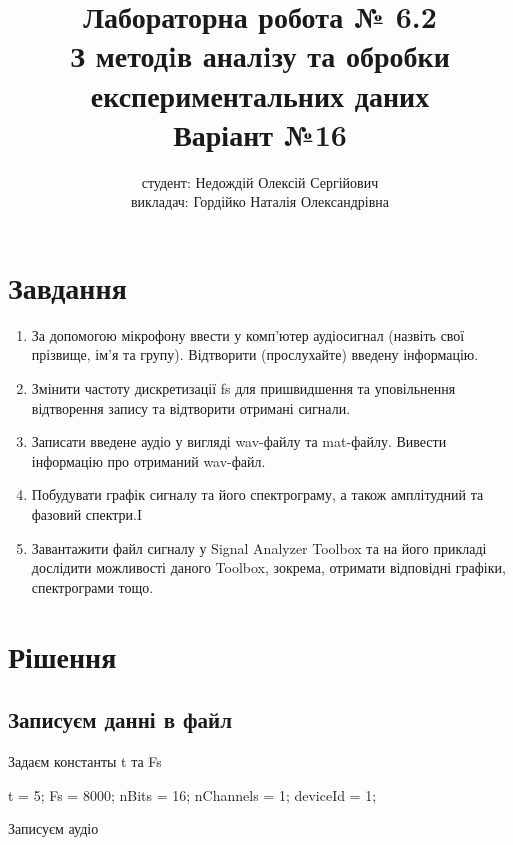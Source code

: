 \documentclass[12pt]{article}
\author{студент: Недождій Олексій Сергійович \\
         викладач: Гордійко Наталія Олександрівна}
\title{Лабораторна робота № 6.2\\
    З методiв аналiзу та обробки\\
    експериментальних даних\\
       Варіант №16}
\date{}
\begin{document}
\maketitle

\section{Завдання}
\begin{enumerate}
    \item
        За допомогою мікрофону ввести у комп'ютер аудіосигнал (назвіть свої
        прізвище, ім’я та групу). Відтворити (прослухайте) введену інформацію.
    \item
        Змінити частоту дискретизації fs для пришвидшення та уповільнення
        відтворення запису та відтворити отримані сигнали.
    \item
        Записати введене аудіо у вигляді wav-файлу та mat-файлу. Вивести
        інформацію про отриманий wav-файл.
    \item
        Побудувати графік сигналу та його спектрограму, а також
        амплітудний та фазовий спектри.I
    \item
        Завантажити файл сигналу у Signal Analyzer Toolbox та на його
        прикладі дослідити можливості даного Toolbox, зокрема, отримати відповідні
        графіки, спектрограми тощо.
\end{enumerate}

\newpage
\section{Рішення}
\subsection*{Записуєм данні в файл}
\begin{par}
\begin{flushleft}
Задаєм константы t та Fs
\end{flushleft}
\end{par}

\begin{matlabcode}
t = 5;
Fs = 8000;
nBits = 16;
nChannels = 1;
deviceId = 1;
\end{matlabcode}

\begin{par}
\begin{flushleft}
Записуєм аудіо
\end{flushleft}
\end{par}
\end{document}
